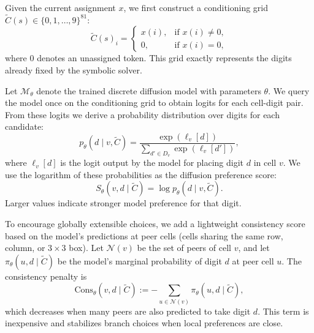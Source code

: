 \documentclass[lettersize,journal]{IEEEtran}
\begin{document}
Given the current assignment $x$, we first construct a conditioning grid $\widetilde{C}(s)\in\{0,1,\dots,9\}^{81}$:
\begin{equation}
	\widetilde{C}(s)_i=
	\begin{cases}
		x(i), & \text{if } x(i)\neq 0,\\
		0,    & \text{if } x(i)=0,
	\end{cases}
	\label{eq:cond_grid}
\end{equation}
where $0$ denotes an unassigned token. This grid exactly represents the digits already fixed by the symbolic solver.

Let $\mathcal{M}_\theta$ denote the trained discrete diffusion model with parameters $\theta$.
We query the model once on the conditioning grid to obtain logits for each cell-digit pair.
From these logits we derive a probability distribution over digits for each candidate:
\begin{equation}
	p_\theta(d \mid v,\widetilde{C}) = \frac{\exp(\ell_v[d])}{\sum_{d'\in D_v}\exp(\ell_v[d'])},
	\label{eq:local_prob}
\end{equation}
where $\ell_v[d]$ is the logit output by the model for placing digit $d$ in cell $v$.
We use the logarithm of these probabilities as the diffusion preference score:
\begin{equation}
	S_\theta(v,d\mid \widetilde{C}) = \log p_\theta(d \mid v,\widetilde{C}).
	\label{eq:pref_def}
\end{equation}
Larger values indicate stronger model preference for that digit.

To encourage globally extensible choices, we add a lightweight consistency score based on the model's predictions at peer cells (cells sharing the same row, column, or $3\times3$ box).
Let $\mathcal{N}(v)$ be the set of peers of cell $v$, and let $\pi_\theta(u,d\mid\widetilde{C})$ be the model's marginal probability of digit $d$ at peer cell $u$.
The consistency penalty is
\begin{equation}
	\mathrm{Cons}_\theta(v,d\mid \widetilde{C})
	:=
	-\sum_{u\in \mathcal{N}(v)} \pi_\theta(u,d\mid \widetilde{C}),
	\label{eq:cons_def}
\end{equation}
which decreases when many peers are also predicted to take digit $d$. This term is inexpensive and stabilizes branch choices when local preferences are close.
\end{document}
